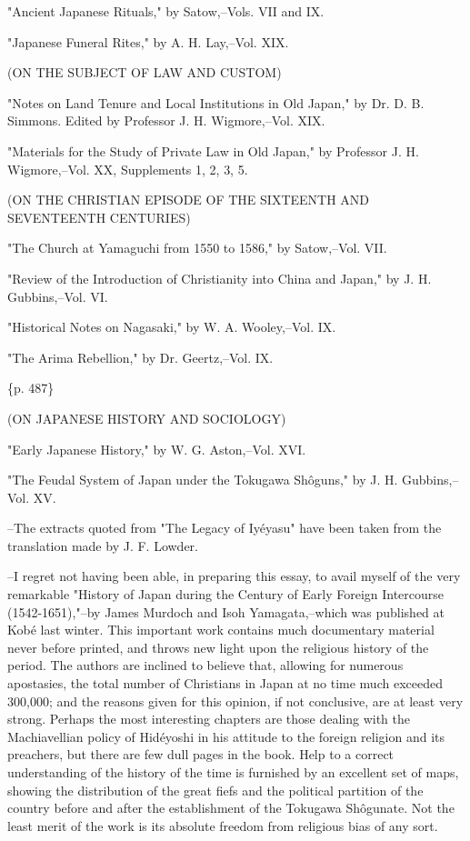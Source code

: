 "Ancient Japanese Rituals," by Satow,--Vols. VII and IX.

"Japanese Funeral Rites," by A. H. Lay,--Vol. XIX.

(ON THE SUBJECT OF LAW AND CUSTOM)

"Notes on Land Tenure and Local Institutions in Old Japan," by Dr. D. B. Simmons. Edited by Professor J. H. Wigmore,--Vol. XIX.

"Materials for the Study of Private Law in Old Japan," by Professor J. H. Wigmore,--Vol. XX, Supplements 1, 2, 3, 5.

(ON THE CHRISTIAN EPISODE OF THE SIXTEENTH AND SEVENTEENTH CENTURIES)

"The Church at Yamaguchi from 1550 to 1586," by Satow,--Vol. VII.

"Review of the Introduction of Christianity into China and Japan," by J. H. Gubbins,--Vol. VI.

"Historical Notes on Nagasaki," by W. A. Wooley,--Vol. IX.

"The Arima Rebellion," by Dr. Geertz,--Vol. IX.

\{p. 487\}

(ON JAPANESE HISTORY AND SOCIOLOGY)

"Early Japanese History," by W. G. Aston,--Vol. XVI.

"The Feudal System of Japan under the Tokugawa Shôguns," by J. H. Gubbins,--Vol. XV.

--The extracts quoted from "The Legacy of Iyéyasu" have been taken from the translation made by J. F. Lowder.

--I regret not having been able, in preparing this essay, to avail myself of the very remarkable "History of Japan during the Century of Early Foreign Intercourse (1542-1651),"--by James Murdoch and Isoh Yamagata,--which was published at Kobé last winter. This important work contains much documentary material never before printed, and throws new light upon the religious history of the period. The authors are inclined to believe that, allowing for numerous apostasies, the total number of Christians in Japan at no time much exceeded 300,000; and the reasons given for this opinion, if not conclusive, are at least very strong. Perhaps the most interesting chapters are those dealing with the Machiavellian policy of Hidéyoshi in his attitude to the foreign religion and its preachers, but there are few dull pages in the book. Help to a correct understanding of the history of the time is furnished by an excellent set of maps, showing the distribution of the great fiefs and the political partition of the country before and after the establishment of the Tokugawa Shôgunate. Not the least merit of the work is its absolute freedom from religious bias of any sort.
